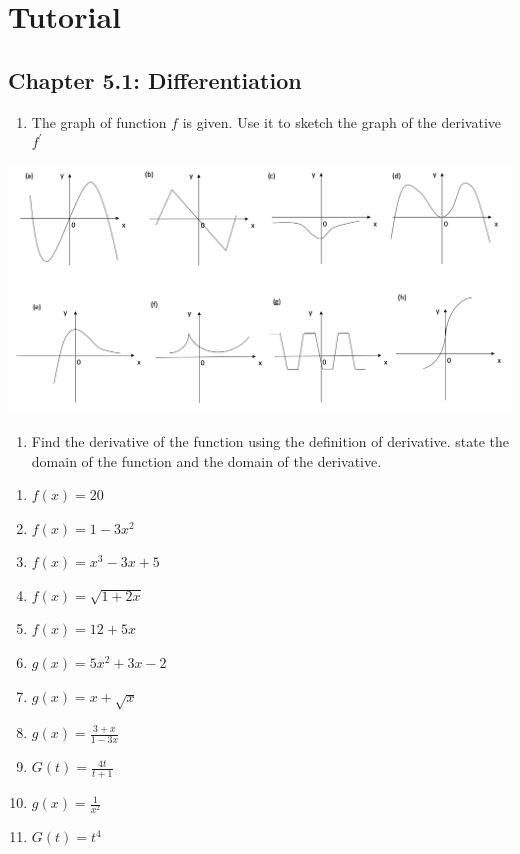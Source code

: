 \documentclass[]{book}
\providecommand{\tightlist}{%
  \setlength{\itemsep}{0pt}\setlength{\parskip}{0pt}}
\begin{document}
\newpage


\hypertarget{tutorial-3}{%
\section{Tutorial}\label{tutorial-3}}

\hypertarget{chapter-5.1-differentiation}{%
\subsection*{Chapter 5.1: Differentiation}\label{chapter-5.1-differentiation}}

\begin{enumerate}
\def\labelenumi{\arabic{enumi}.}
\tightlist
\item
  The graph of function \(f\) is given. Use it to sketch the graph of the derivative \(f^\prime\)
\end{enumerate}

\begin{center}\includegraphics[width=1\linewidth]{figure/5Derivatives-8} \end{center}

\begin{enumerate}
\def\labelenumi{\arabic{enumi}.}
\setcounter{enumi}{1}
\tightlist
\item
  Find the derivative of the function using the definition of derivative. state the domain of the function and the domain of the derivative.
\end{enumerate}

\begin{enumerate}
\def\labelenumi{(\alph{enumi})}
\tightlist
\item
  \(f(x) = 20\)
\item
  \(f(x) = 1-3x^2\)
\item
  \(f(x) = x^3 -3x+5\)
\item
  \(f(x) = \sqrt{1+2x}\)
\item
  \(f(x) = 12+5x\)
\item
  \(g(x) = 5x^2+3x-2\)
\item
  \(g(x) = x+\sqrt{x}\)
\item
  \(g(x) = \frac{3+x}{1-3x}\)
\item
  \(G(t) = \frac{4t}{t+1}\)
\item
  \(g(x) = \frac{1}{x^2}\)
\item
  \(G(t) = t^4\)
\end{enumerate}
\end{document}
